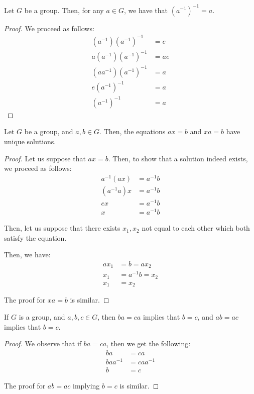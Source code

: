 \documentclass[openany]{book}
\begin{document}
\begin{prop}
	Let $G$ be a group. Then, for any $a \in G$, we have that $(a^{-1})^{-1} = a$.
\end{prop}
\begin{proof}
	We proceed as follows:
	\begin{align*}
		(a^{-1})(a^{-1})^{-1} &= e \\
		a(a^{-1})(a^{-1})^{-1} &= ae \\
		(aa^{-1})(a^{-1})^{-1} &= a \\
		e(a^{-1})^{-1} &= a \\
		(a^{-1})^{-1} &= a
	\end{align*}
\end{proof}

\begin{prop}
	Let $G$ be a group, and $a, b \in G$. Then, the equations $ax = b$ and $xa = b$ have unique solutions.
\end{prop}
\begin{proof}
	Let us suppose that $ax = b$. Then, to show that a solution indeed exists, we proceed as follows:
	\begin{align*}
		a^{-1}(ax) &= a^{-1}b \\
		(a^{-1}a)x &= a^{-1}b \\
		ex &= a^{-1}b \\
		x &= a^{-1}b
	\end{align*}

	Then, let us suppose that there exists $x_1, x_2$ not equal to each other which both satisfy the equation.
	
	Then, we have:
	\begin{align*}
		ax_1 &= b = ax_2 \\
		x_1 &= a^{-1}b = x_2 \\
		x_1 &= x_2
	\end{align*}

	The proof for $xa = b$ is similar.
\end{proof}

\begin{prop}
	If $G$ is a group, and $a,b,c \in G$, then $ba = ca$ implies that $b = c$, and $ab = ac$ implies that $b = c$.
\end{prop}
\begin{proof}
	We observe that if $ba = ca$, then we get the following:
	\begin{align*}
		ba &= ca \\
		baa^{-1} &= caa^{-1} \\
		b &= c
	\end{align*}

	The proof for $ab = ac$ implying $b = c$ is similar.
\end{proof}
\end{document}

